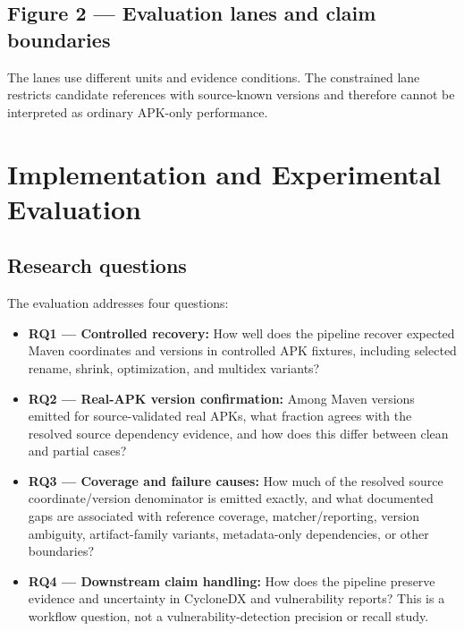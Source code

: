 \documentclass[10pt,twocolumn]{article}
\begin{document}
\subsection{Figure 2 — Evaluation lanes and claim boundaries}
\begin{center}\end{center}
The lanes use different units and evidence conditions. The constrained lane restricts candidate references with source-known versions and therefore cannot be interpreted as ordinary APK-only performance.
\section{Implementation and Experimental Evaluation}
\subsection{Research questions}
The evaluation addresses four questions:
\begin{itemize}
\item \textbf{RQ1 — Controlled recovery:} How well does the pipeline recover expected
Maven coordinates and versions in controlled APK fixtures, including selected rename, shrink, optimization, and multidex variants?
\item \textbf{RQ2 — Real-APK version confirmation:} Among Maven versions emitted for
source-validated real APKs, what fraction agrees with the resolved source dependency evidence, and how does this differ between clean and partial cases?
\item \textbf{RQ3 — Coverage and failure causes:} How much of the resolved source
coordinate/version denominator is emitted exactly, and what documented gaps are associated with reference coverage, matcher/reporting, version ambiguity, artifact-family variants, metadata-only dependencies, or other boundaries?
\item \textbf{RQ4 — Downstream claim handling:} How does the pipeline preserve evidence
and uncertainty in CycloneDX and vulnerability reports? This is a workflow question, not a vulnerability-detection precision or recall study.
\end{itemize}
\end{document}
